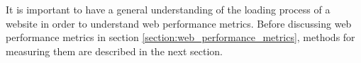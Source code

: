 
It is important to have a general understanding of the loading process of a website in order to understand web performance metrics.
Before discussing web performance metrics in section \ref{section:web_performance_metrics}, methods for measuring them are described in the next section.








